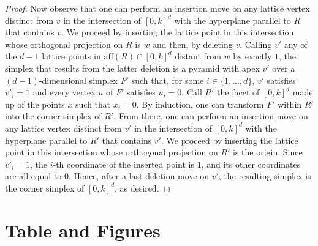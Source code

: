 \begin{proof}
Now observe that one can perform an insertion move on any lattice vertex distinct from $v$ in the intersection of $[0,k]^d$ with the hyperplane parallel to $R$ that contains $v$. We proceed by inserting the lattice point in this intersection whose orthogonal projection on $R$ is $w$ and then, by deleting $v$. Calling $v'$ any of the $d-1$ lattice points in $\mathrm{aff}(R)\cap[0,k]^d$ distant from $w$ by exactly $1$, the simplex that results from the latter deletion is a pyramid with apex $v'$ over a $(d-1)$-dimensional simplex $F'$ such that, for some $i\in\{1, ..., d\}$, $v'$ satisfies $v'_i=1$ and every vertex $u$ of $F'$ satisfies $u_i=0$. Call $R'$ the facet of $[0,k]^d$ made up of the points $x$ such that $x_i=0$. By induction, one can transform $F'$ within $R'$ into the corner simplex of $R'$. From there, one can perform an insertion move on any lattice vertex distinct from $v'$ in the intersection of $[0,k]^d$ with the hyperplane parallel to $R'$ that contains $v'$. We proceed by inserting the lattice point in this intersection whose orthogonal projection on $R'$ is the origin. Since $v'_i=1$, the $i$-th coordinate of the inserted point is $1$, and its other coordinates are all equal to $0$. Hence, after a last deletion move on $v'$, the resulting simplex is the corner simplex of $[0,k]^d$, as desired.
\end{proof}

\clearpage
\section{Table and Figures}\label{Sec.Tab}

